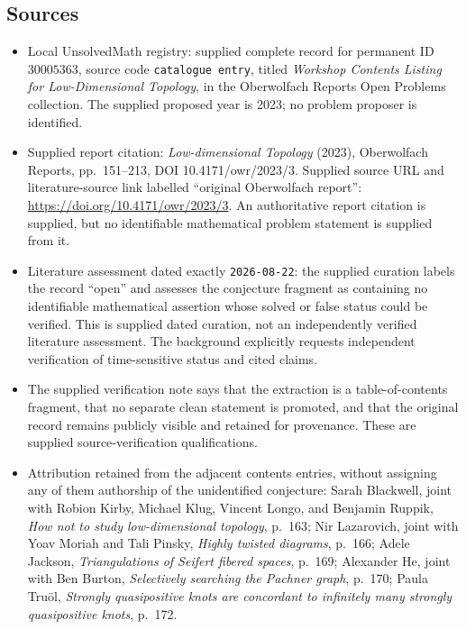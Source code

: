 \documentclass[11pt]{article}
\begin{document}
\subsection{Sources}
\begin{itemize}
\item Local UnsolvedMath registry: supplied complete record for permanent ID \(30005363\), source code \texttt{catalogue entry}, titled \emph{Workshop Contents Listing for Low-Dimensional Topology}, in the Oberwolfach Reports Open Problems collection. The supplied proposed year is 2023; no problem proposer is identified.
\item Supplied report citation: \emph{Low-dimensional Topology} (2023), Oberwolfach Reports, pp.\ 151--213, DOI 10.4171/owr/2023/3. Supplied source URL and literature-source link labelled ``original Oberwolfach report'': \url{https://doi.org/10.4171/owr/2023/3}. An authoritative report citation is supplied, but no identifiable mathematical problem statement is supplied from it.
\item Literature assessment dated exactly \texttt{2026-08-22}: the supplied curation labels the record ``open'' and assesses the conjecture fragment as containing no identifiable mathematical assertion whose solved or false status could be verified. This is supplied dated curation, not an independently verified literature assessment. The background explicitly requests independent verification of time-sensitive status and cited claims.
\item The supplied verification note says that the extraction is a table-of-contents fragment, that no separate clean statement is promoted, and that the original record remains publicly visible and retained for provenance. These are supplied source-verification qualifications.
\item Attribution retained from the adjacent contents entries, without assigning any of them authorship of the unidentified conjecture: Sarah Blackwell, joint with Robion Kirby, Michael Klug, Vincent Longo, and Benjamin Ruppik, \emph{How not to study low-dimensional topology}, p.\ 163; Nir Lazarovich, joint with Yoav Moriah and Tali Pinsky, \emph{Highly twisted diagrams}, p.\ 166; Adele Jackson, \emph{Triangulations of Seifert fibered spaces}, p.\ 169; Alexander He, joint with Ben Burton, \emph{Selectively searching the Pachner graph}, p.\ 170; Paula Truöl, \emph{Strongly quasipositive knots are concordant to infinitely many strongly quasipositive knots}, p.\ 172.

\end{itemize}
\end{document}
